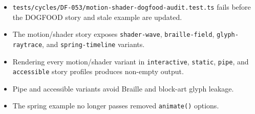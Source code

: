 \begin{itemize}
\tightlist
\item
  \texttt{t\allowbreak{}e\allowbreak{}s\allowbreak{}t\allowbreak{}s\allowbreak{}/\allowbreak{}c\allowbreak{}y\allowbreak{}c\allowbreak{}l\allowbreak{}e\allowbreak{}s\allowbreak{}/\allowbreak{}D\allowbreak{}F\allowbreak{}-\allowbreak{}0\allowbreak{}5\allowbreak{}3\allowbreak{}/\allowbreak{}m\allowbreak{}o\allowbreak{}t\allowbreak{}i\allowbreak{}o\allowbreak{}n\allowbreak{}-\allowbreak{}s\allowbreak{}h\allowbreak{}a\allowbreak{}d\allowbreak{}e\allowbreak{}r\allowbreak{}-\allowbreak{}d\allowbreak{}o\allowbreak{}g\allowbreak{}f\allowbreak{}o\allowbreak{}o\allowbreak{}d\allowbreak{}-\allowbreak{}a\allowbreak{}u\allowbreak{}d\allowbreak{}i\allowbreak{}t\allowbreak{}.\allowbreak{}t\allowbreak{}e\allowbreak{}s\allowbreak{}t\allowbreak{}.\allowbreak{}t\allowbreak{}s} fails before the DOGFOOD story and stale example are updated.
\item
  The motion/shader story exposes \texttt{s\allowbreak{}h\allowbreak{}a\allowbreak{}d\allowbreak{}e\allowbreak{}r\allowbreak{}-\allowbreak{}w\allowbreak{}a\allowbreak{}v\allowbreak{}e}, \texttt{b\allowbreak{}r\allowbreak{}a\allowbreak{}i\allowbreak{}l\allowbreak{}l\allowbreak{}e\allowbreak{}-\allowbreak{}f\allowbreak{}i\allowbreak{}e\allowbreak{}l\allowbreak{}d}, \texttt{g\allowbreak{}l\allowbreak{}y\allowbreak{}p\allowbreak{}h\allowbreak{}-\allowbreak{}r\allowbreak{}a\allowbreak{}y\allowbreak{}t\allowbreak{}r\allowbreak{}a\allowbreak{}c\allowbreak{}e}, and \texttt{s\allowbreak{}p\allowbreak{}r\allowbreak{}i\allowbreak{}n\allowbreak{}g\allowbreak{}-\allowbreak{}t\allowbreak{}i\allowbreak{}m\allowbreak{}e\allowbreak{}l\allowbreak{}i\allowbreak{}n\allowbreak{}e} variants.
\item
  Rendering every motion/shader variant in \texttt{i\allowbreak{}n\allowbreak{}t\allowbreak{}e\allowbreak{}r\allowbreak{}a\allowbreak{}c\allowbreak{}t\allowbreak{}i\allowbreak{}v\allowbreak{}e}, \texttt{s\allowbreak{}t\allowbreak{}a\allowbreak{}t\allowbreak{}i\allowbreak{}c}, \texttt{p\allowbreak{}i\allowbreak{}p\allowbreak{}e}, and \texttt{a\allowbreak{}c\allowbreak{}c\allowbreak{}e\allowbreak{}s\allowbreak{}s\allowbreak{}i\allowbreak{}b\allowbreak{}l\allowbreak{}e} story profiles produces non-empty output.
\item
  Pipe and accessible variants avoid Braille and block-art glyph leakage.
\item
  The spring example no longer passes removed \texttt{a\allowbreak{}n\allowbreak{}i\allowbreak{}m\allowbreak{}a\allowbreak{}t\allowbreak{}e\allowbreak{}(\allowbreak{})} options.
\end{itemize}

